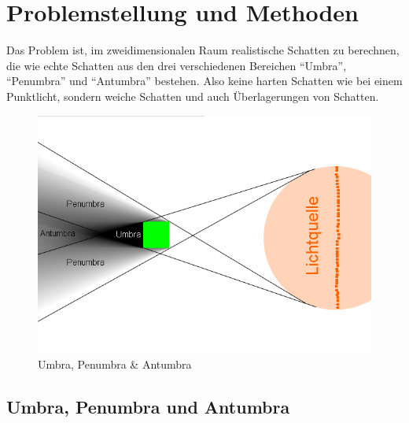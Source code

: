\label{sec:methods}
\section{Problemstellung und Methoden}

Das Problem ist, im zweidimensionalen Raum realistische Schatten zu berechnen, die wie echte
Schatten aus den drei verschiedenen Bereichen "`Umbra"', "`Penumbra"' und "`Antumbra"' bestehen.
Also keine harten Schatten wie bei einem Punktlicht, sondern weiche Schatten und auch
Überlagerungen von Schatten.

\begin{figure}[t]
	\centering
	\includegraphics[width=\columnwidth]{images/umbra_penumbra_antumbra.png}
	\caption{Umbra, Penumbra \& Antumbra}
	\label{fig:umbra}
\end{figure}

\subsection{Umbra, Penumbra und Antumbra}

